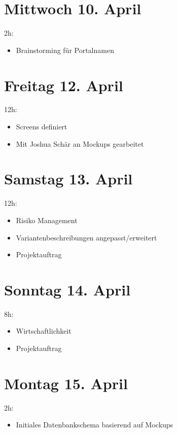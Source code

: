 \section{Mittwoch 10. April}\label{mittwoch-10.april}

2h:

\begin{itemize}
  \tightlist
  \item
        Brainstorming für Portalnamen
\end{itemize}

\section{Freitag 12. April}\label{freitag-12.april}

12h:

\begin{itemize}
  \tightlist
  \item
        Screens definiert
  \item
        Mit Joshua Schär an Mockups gearbeitet
\end{itemize}

\section{Samstag 13. April}\label{samstag-13.april}

12h:

\begin{itemize}
  \tightlist
  \item
        Risiko Management
  \item
        Variantenbeschreibungen angepasst/erweitert
  \item
        Projektauftrag
\end{itemize}

\section{Sonntag 14. April}\label{sonntag-14.april}

8h:

\begin{itemize}
  \tightlist
  \item
        Wirtschaftlichkeit
  \item
        Projektauftrag
\end{itemize}

\section{Montag 15. April}\label{montag-15.april}

2h:

\begin{itemize}
  \tightlist
  \item
        Initiales Datenbankschema basierend auf Mockups
\end{itemize}
